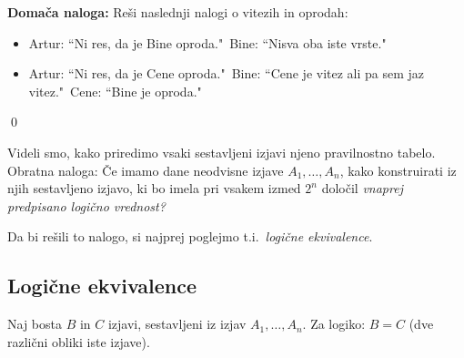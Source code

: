 \documentclass[12pt,a4paper]{article}
\def\cee {{~\Leftrightarrow~}}
\begin{document}
\medskip

{\bf Domača naloga:} Reši naslednji nalogi o vitezih in oprodah:
\begin{itemize}
  \item Artur: ``Ni res, da je Bine oproda."~Bine: ``Nisva oba iste vrste."
  \item Artur: ``Ni res, da je Cene oproda."~Bine: ``Cene je vitez ali pa sem jaz vitez."~Cene: ``Bine je oproda."
\end{itemize}
\qed


Videli smo, kako priredimo vsaki sestavljeni izjavi njeno pravilnostno tabelo.
Obratna naloga: Če imamo dane neodvisne izjave $A_1,\ldots, A_n$,
kako konstruirati iz njih sestavljeno izjavo, ki bo imela
pri vsakem izmed $2^n$ določil {\em vnaprej predpisano logično vrednost?}

Da bi rešili to nalogo, si najprej poglejmo t.i.~{\em logične ekvivalence}.

\subsection{Logične ekvivalence}

Naj bosta $B$ in $C$ izjavi, sestavljeni iz izjav $A_1,\ldots, A_n$.
\iftoggle{long}{
{\color{blue}
Če je izjava $B\cee C$ tavtologija, pravimo, da sta $B$ in $C$ {\em logično ekvivalentni}.
}
}
{
Če je izjava $B\cee C$ tavtologija, pravimo, da sta $B$ in $C$ {\em logično ekvivalentni}.
}
Za logiko: $B = C$ (dve  različni obliki iste izjave).
\end{document}
